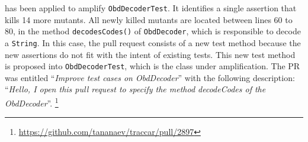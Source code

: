\dspot has been applied to amplify \texttt{ObdDecoderTest}. 
It identifies a single assertion that kills 14 more mutants.
All newly killed mutants are located between lines 60 to 80, \ie in the method \texttt{decodesCodes()} of \texttt{ObdDecoder}, which is responsible to decode a \texttt{String}. 
In this case, the pull request consists of a new test method because the new assertions do not fit with the intent of existing tests. 
This new test method is proposed into \texttt{ObdDecoderTest}, which is the class under amplification. 
The PR was entitled ``\emph{Improve test cases on ObdDecoder}'' with the following description: ``\emph{Hello, I open this pull request to specify the method decodeCodes of the ObdDecoder}''. \footnote{\url{https://github.com/tananaev/traccar/pull/2897}}
\begin{figure}[H]
	\centering{}
\end{figure}

